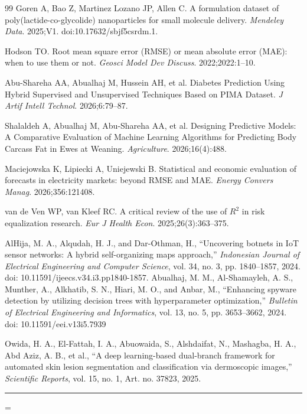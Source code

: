 \documentclass[10pt]{NSP1}
\begin{document}
\begin{thebibliography}{99}
 Goren A, Bao Z, Martinez Lozano JP, Allen C. A formulation dataset of
poly(lactide-co-glycolide) nanoparticles for small molecule delivery. \textit{Mendeley Data}.
2025;V1. doi:10.17632/sbjf5csrdm.1.

 Hodson TO. Root mean square error (RMSE) or mean absolute error (MAE): when to
use them or not. \textit{Geosci Model Dev Discuss}. 2022;2022:1--10.

 Abu-Shareha AA, Abualhaj M, Hussein AH, et al. Diabetes Prediction Using Hybrid
Supervised and Unsupervised Techniques Based on PIMA Dataset. \textit{J Artif Intell Technol}.
2026;6:79--87.

 Shalaldeh A, Abualhaj M, Abu-Shareha AA, et al. Designing Predictive Models: A
Comparative Evaluation of Machine Learning Algorithms for Predicting Body Carcass Fat in Ewes at
Weaning. \textit{Agriculture}. 2026;16(4):488.

 Maciejowska K, Lipiecki A, Uniejewski B. Statistical and economic evaluation of
forecasts in electricity markets: beyond RMSE and MAE. \textit{Energy Convers Manag}.
2026;356:121408.

 van de Ven WP, van Kleef RC. A critical review of the use of $R^2$ in risk
equalization research. \textit{Eur J Health Econ}. 2025;26(3):363--375.

 AlHija, M. A., Alqudah, H. J., and Dar-Othman, H.,
``Uncovering botnets in IoT sensor networks: A hybrid self-organizing maps approach,''
\emph{Indonesian Journal of Electrical Engineering and Computer Science},
vol. 34, no. 3, pp. 1840--1857, 2024.
doi: 10.11591/ijeecs.v34.i3.pp1840-1857.
 Abualhaj, M. M., Al-Shamayleh, A. S., Munther, A., Alkhatib, S. N., Hiari, M. O., and Anbar, M.,
``Enhancing spyware detection by utilizing decision trees with hyperparameter optimization,''
\emph{Bulletin of Electrical Engineering and Informatics},
vol. 13, no. 5, pp. 3653--3662, 2024.
doi: 10.11591/eei.v13i5.7939

 Owida, H. A., El-Fattah, I. A., Abuowaida, S., Alshdaifat, N.,
Mashagba, H. A., Abd Aziz, A. B., et al.,
``A deep learning-based dual-branch framework for automated skin lesion segmentation and classification via dermoscopic images,''
\emph{Scientific Reports},
vol. 15, no. 1, Art. no. 37823, 2025.

\end{thebibliography}
\begin{center}
    \rule{6 cm}{0.02 cm}
\end{center}
\emergencystretch=\hsize
\end{document}
